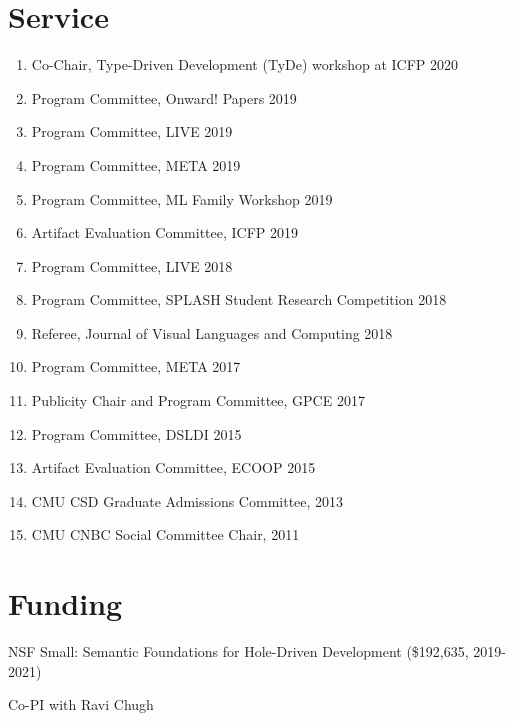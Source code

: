 \documentclass[10pt,letterpaper]{article}
\renewenvironment{itemize}{
  \begin{list}{}{
    \setlength{\leftmargin}{1.25em}
    \setlength{\itemsep}{0.25em}
    \setlength{\parskip}{0pt}
    \setlength{\parsep}{0.2em}
  }
}{
  \end{list}
}
\begin{document}
\section*{Service}
\begin{enumerate}
  \item Co-Chair, Type-Driven Development (TyDe) workshop at ICFP 2020
  \item Program Committee, Onward! Papers 2019	
  \item Program Committee, LIVE 2019
  \item Program Committee, META 2019
  \item Program Committee, ML Family Workshop 2019
  \item Artifact Evaluation Committee, ICFP 2019
  \item Program Committee, LIVE 2018
  \item Program Committee, SPLASH Student Research Competition 2018
  \item Referee, Journal of Visual Languages and Computing 2018
  \item Program Committee, META 2017
  \item Publicity Chair and Program Committee, GPCE 2017
  \item Program Committee, DSLDI 2015
  \item Artifact Evaluation Committee, ECOOP 2015
  \item CMU CSD Graduate Admissions Committee, 2013
  \item CMU CNBC Social Committee Chair, 2011
\end{enumerate}



\section*{Funding}

\begin{itemize}
  \item NSF Small: Semantic Foundations for Hole-Driven Development (\$192,635, 2019-2021)
    \begin{itemize}
      \item Co-PI with Ravi Chugh
    \end{itemize}
\end{itemize}

\end{document}
